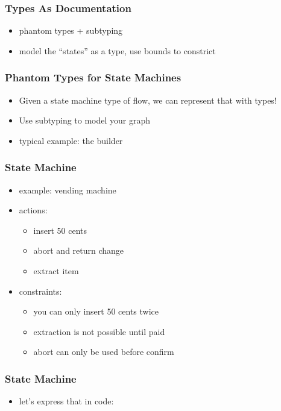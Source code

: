 \documentclass{beamer}
\begin{document}
\begin{frame}
  \frametitle{Types As Documentation}
  \begin{itemize}
  \item phantom types + subtyping
  \item model the ``states'' as a type, use bounds to constrict
  \end{itemize}
\end{frame}

\begin{frame}
  \frametitle{Phantom Types for State Machines}
  \begin{itemize}
  \item Given a state machine type of flow, we can represent that with
    types!
  \item Use subtyping to model your graph
  \item typical example: the builder
  \end{itemize}
\end{frame}

\begin{frame}
  \frametitle{State Machine}
  \begin{itemize}
  \item example: vending machine
  \item actions:
    \begin{itemize}
    \item insert 50 cents
    \item abort and return change
    \item extract item
    \end{itemize}
  \item constraints:
    \begin{itemize}
    \item you can only insert 50 cents twice
    \item extraction is not possible until paid
    \item abort can only be used before confirm
    \end{itemize}
  \end{itemize}
\end{frame}

\begin{frame}[fragile]
  \frametitle{State Machine}
  \begin{itemize}
  \item let's express that in code:
  \end{itemize}

\begin{verbatim}

\end{verbatim}
\end{frame}
\end{document}
